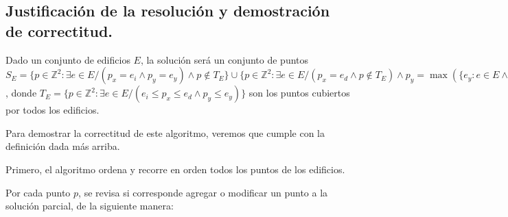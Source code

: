 \subsection{Justificación de la resolución y demostración de correctitud.}

\vspace*{0.3cm}


Dado un conjunto de edificios $E$, la solución será un conjunto de puntos
$S_E = \{p \in \mathbb{Z}^2 : \exists e \in E / (p_x = e_i \land p_y = e_y) \land
p \notin T_E\} \cup \{p \in \mathbb{Z}^2 : \exists e \in E / (p_x = e_d \land p
\notin T_E) \land p_y = \max({\{e_y : e \in E \land e_i \leq p_x < e_d\} \cup \{0\}})\}$,
donde $T_E = \{p \in \mathbb{Z}^2 : \exists e \in E / (e_i \leq p_x \leq e_d \land p_y \leq e_y)\}$
son los puntos cubiertos por todos los edificios.

Para demostrar la correctitud de este algoritmo, veremos que cumple con la
definición dada más arriba.

Primero, el algoritmo ordena y recorre en orden todos los puntos de los edificios.

Por cada punto $p$, se revisa si corresponde agregar o modificar un punto a la
solución parcial, de la siguiente manera:

